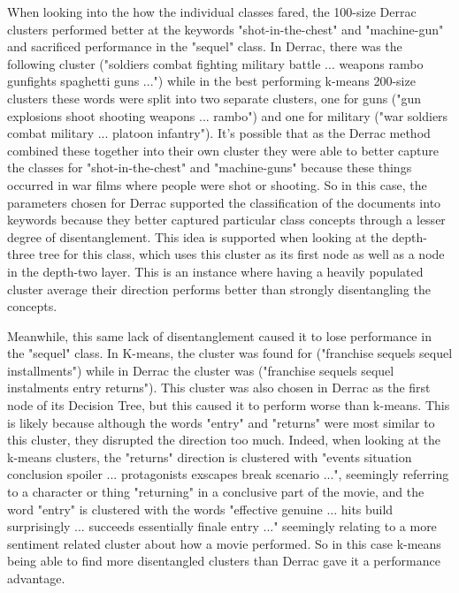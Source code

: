 When looking into the how the individual classes fared, the 100-size Derrac clusters performed better at the keywords "shot-in-the-chest" and "machine-gun" and sacrificed performance in the "sequel" class. In Derrac, there was the following cluster ("soldiers combat fighting military battle ... weapons rambo gunfights spaghetti guns ...") while in the best performing k-means 200-size clusters these words were split into two separate clusters, one for guns ("gun explosions shoot shooting weapons ... rambo") and one for military ("war soldiers combat military ... platoon infantry"). It's possible that as the Derrac method combined these together into their own cluster they were able to better capture the classes for "shot-in-the-chest" and "machine-guns" because these things occurred in war films where people were shot or shooting. So in this case, the parameters chosen for Derrac supported the classification of the documents into keywords because they better captured particular class concepts through a lesser degree of disentanglement. This idea is supported when looking at the depth-three tree for this class, which uses this cluster as its first node as well as a node in the depth-two layer. This is an instance where having a heavily populated cluster average their direction performs better than strongly disentangling the concepts. 

Meanwhile, this same lack of disentanglement caused it to lose performance in the "sequel" class. In K-means, the cluster was found for ("franchise sequels sequel installments") while in Derrac the cluster was ("franchise sequels sequel instalments entry returns"). This cluster was also chosen in Derrac as the first node of its Decision Tree, but this caused it to perform worse than k-means. This is likely because although the words "entry" and "returns" were most similar to this cluster, they disrupted the direction too much. Indeed, when looking at the k-means clusters, the "returns" direction is clustered with "events situation conclusion spoiler ... protagonists exscapes break scenario ...", seemingly referring to a character or thing "returning" in a conclusive part of the movie, and the word "entry" is clustered with the words "effective genuine ... hits build surprisingly ... succeeds essentially finale entry ..." seemingly relating to a more sentiment related cluster about how a movie performed. So in this case k-means being able to find more disentangled clusters than Derrac gave it a performance advantage. 

